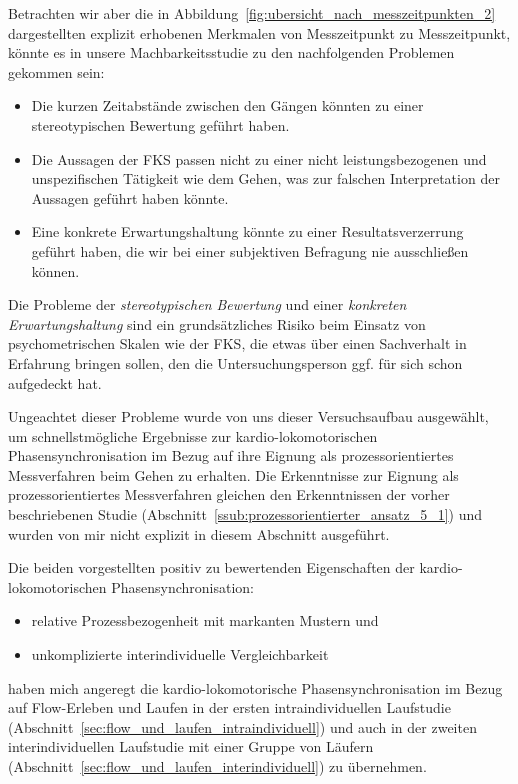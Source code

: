 Betrachten wir aber die in Abbildung~\ref{fig:ubersicht_nach_messzeitpunkten_2} dargestellten explizit erhobenen Merkmalen von Messzeitpunkt zu Messzeitpunkt, könnte es in unsere Machbarkeitsstudie zu den nachfolgenden Problemen gekommen sein: 
\begin{itemize}
	
	\item Die kurzen Zeitabstände zwischen den Gängen könnten zu einer stereotypischen Bewertung geführt haben.
	
	\item Die Aussagen der \ac{FKS} passen nicht zu einer nicht leistungsbezogenen und unspezifischen Tätigkeit wie dem Gehen, was zur falschen Interpretation der Aussagen geführt haben könnte.
	
	\item Eine konkrete Erwartungshaltung könnte zu einer Resultatsverzerrung geführt haben, die wir bei einer subjektiven Befragung nie ausschließen können. 
\end{itemize}

Die Probleme der \emph{stereotypischen Bewertung} und einer \emph{konkreten Erwartungshaltung} sind ein grundsätzliches Risiko beim Einsatz von psychometrischen Skalen wie der \ac{FKS}, die etwas über einen Sachverhalt in Erfahrung bringen sollen, den die Untersuchungsperson ggf. für sich schon aufgedeckt hat.

Ungeachtet dieser Probleme wurde von uns dieser Versuchsaufbau ausgewählt, um schnellstmögliche Ergebnisse zur kardio-lokomotorischen Phasensynchronisation im Bezug auf ihre Eignung als prozessorientiertes Messverfahren beim Gehen zu erhalten. Die Erkenntnisse zur Eignung als prozessorientiertes Messverfahren gleichen den Erkenntnissen der vorher beschriebenen Studie (Abschnitt~\ref{ssub:prozessorientierter_ansatz_5_1}) und wurden von mir nicht explizit in diesem Abschnitt ausgeführt.

Die beiden vorgestellten positiv zu bewertenden Eigenschaften der kardio-lokomotorischen Phasensynchronisation: 
\begin{itemize}
	
	\item relative Prozessbezogenheit mit markanten Mustern und
	
	\item unkomplizierte interindividuelle Vergleichbarkeit 
\end{itemize}

haben mich angeregt die kardio-lokomotorische Phasensynchronisation im Bezug auf Flow-Erleben und Laufen in der ersten intraindividuellen Laufstudie (Abschnitt~\ref{sec:flow_und_laufen_intraindividuell}) und auch in der zweiten interindividuellen Laufstudie mit einer Gruppe von Läufern (Abschnitt~\ref{sec:flow_und_laufen_interindividuell}) zu übernehmen.

